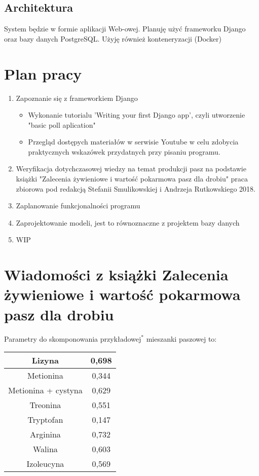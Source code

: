 \documentclass[shortabstract]{iithesis}
\begin{document}
\section {Architektura}
	System będzie w formie aplikacji Web-owej. Planuję użyć frameworku Django oraz bazy danych PostgreSQL. Użyję również konteneryzacji (Docker)

\chapter{Plan pracy}
	\begin{enumerate}
		\item  Zapoznanie się z frameworkiem Django
			\begin{itemize}
				\item Wykonanie tutorialu 'Writing your first Django app', czyli utworzenie "basic poll aplication"
				\item Przegląd dostępych materiałów w serwisie Youtube w celu zdobycia praktycznych wskazówek przydatnych przy pisaniu programu.
			\end{itemize}
		\item Weryfikacja dotychczasowej wiedzy na temat produkcji pasz na podstawie książki "Zalecenia żywieniowe i wartość pokarmowa pasz dla drobiu" praca zbiorowa pod redakcją Stefanii Smulikowskiej i Andrzeja Rutkowskiego 2018.
		\item Zaplanowanie funkcjonalności programu
		\item Zaprojektowanie modeli, jest to równoznaczne z projektem bazy danych
		\item WIP
	\end{enumerate}
	
\chapter{Wiadomości z  książki Zalecenia żywieniowe i wartość pokarmowa pasz dla drobiu}
	Parametry do skomponowania przykładowej$^*$ mieszanki paszowej to:
	
	\begin{tabular}{|c|c|}
		\hline
		Lizyna &0,698 \\
		\hline
		Metionina &0,344 \\
		\hline
		Metionina + cystyna &0,629 \\
		\hline
		Treonina &0,551 \\
		\hline
		Tryptofan &0,147 \\
		\hline
		Arginina &0,732 \\
		\hline
		Walina &0,603 \\
		\hline
		Izoleucyna &0,569 \\
		\hline
	\end{tabular}
	
\end{document}
